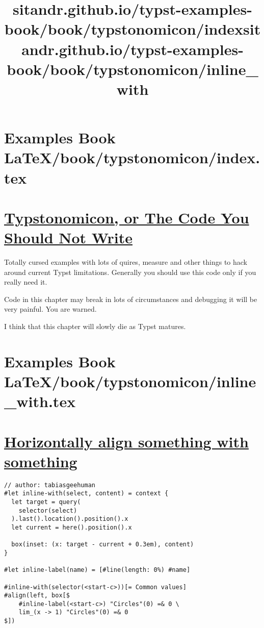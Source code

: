 \pandocbounded{}


\section{Examples Book LaTeX/book/typstonomicon/index.tex}
\title{sitandr.github.io/typst-examples-book/book/typstonomicon/index}

\section{\texorpdfstring{\hyperref[typstonomicon-or-the-code-you-should-not-write]{Typstonomicon,
or The Code You Should Not
Write}}{Typstonomicon, or The Code You Should Not Write}}\label{typstonomicon-or-the-code-you-should-not-write}

Totally cursed examples with lots of quires, measure and other things to
hack around current Typst limitations. Generally you should use this
code only if you really need it.

Code in this chapter may break in lots of circumstances and debugging it
will be very painful. You are warned.

I think that this chapter will slowly die as Typst matures.


\section{Examples Book LaTeX/book/typstonomicon/inline_with.tex}
\title{sitandr.github.io/typst-examples-book/book/typstonomicon/inline_with}

\section{\texorpdfstring{\hyperref[horizontally-align-something-with-something]{Horizontally
align something with
something}}{Horizontally align something with something}}\label{horizontally-align-something-with-something}

\begin{verbatim}
// author: tabiasgeehuman
#let inline-with(select, content) = context {
  let target = query(
    selector(select)
  ).last().location().position().x
  let current = here().position().x

  box(inset: (x: target - current + 0.3em), content)
}

#let inline-label(name) = [#line(length: 0%) #name]

#inline-with(selector(<start-c>))[= Common values]
#align(left, box[$
    #inline-label(<start-c>) "Circles"(0) =& 0 \
    lim_(x -> 1) "Circles"(0) =& 0
$])
\end{verbatim}

